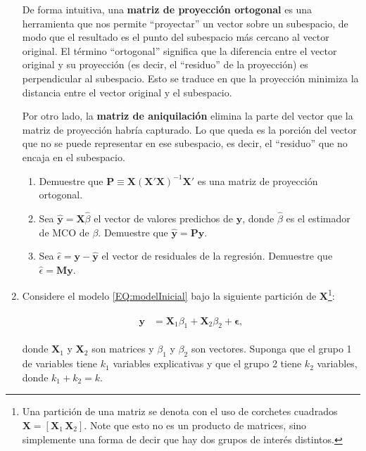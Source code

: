 \documentclass[a4paper, answers, addpoints, 11pt]{exam}
\begin{document}
\begin{enumerate}
    De forma intuitiva, una \textbf{matriz de proyección ortogonal} es una herramienta que nos permite ``proyectar'' un vector sobre un subespacio, de modo que el resultado es el punto del subespacio más cercano al vector original. El término ``ortogonal'' significa que la diferencia entre el vector original y su proyección (es decir, el ``residuo'' de la proyección) es perpendicular al subespacio. Esto se traduce en que la proyección minimiza la distancia entre el vector original y el subespacio.
    
    \bigskip Por otro lado, la \textbf{matriz de aniquilación} elimina la parte del vector que la matriz de proyección habría capturado. Lo que queda es la porción del vector que no se puede representar en ese subespacio, es decir, el ``residuo'' que no encaja en el subespacio. \\
    
    \begin{enumerate}
        \item Demuestre que \(\mathbf{P} \equiv \mathbf{X}(\mathbf{X'}\mathbf{X})^{-1}\mathbf{X'}\) es una matriz de proyección ortogonal.
        \item Sea \(\mathbf{\hat{y}} = \mathbf{X}\hat\beta\) el vector de valores predichos de \(\mathbf{y}\), donde \(\hat\beta\) es el estimador de MCO de \(\beta\). Demuestre que \(\mathbf{\hat{y}} = \mathbf{P}\mathbf{y}\).
        \item Sea \(\hat{\epsilon} = \mathbf{y} - \mathbf{\hat{y}}\) el vector de residuales de la regresión. Demuestre que \(\hat{\epsilon} = \mathbf{M} \mathbf{y}\).
    \end{enumerate}
    \bigskip

    \item Considere el modelo \eqref{EQ:modelInicial} bajo la siguiente partición de $\mathbf{X}$\footnote{Una partición de una matriz se denota con el uso de corchetes cuadrados $\mathbf{X} = [\mathbf{X}_1 \, \mathbf{X}_2]$. Note que esto no es un producto de matrices, sino simplemente una forma de decir que hay dos grupos de interés distintos.}:

    \begin{align}
    \begin{split}
        \textbf{y} &= \textbf{X}_1 \beta_1 + \textbf{X}_2 \beta_2 + \boldsymbol\epsilon,
    \end{split}
    \end{align}

    donde $\textbf{X}_1$ y $\textbf{X}_2$ son matrices y $\beta_1$ y $\beta_2$ son vectores. Suponga que el grupo 1 de variables tiene $k_1$ variables explicativas y que el grupo 2 tiene $k_2$ variables, donde $k_1 + k_2 = k$.


\end{enumerate}
\end{document}
